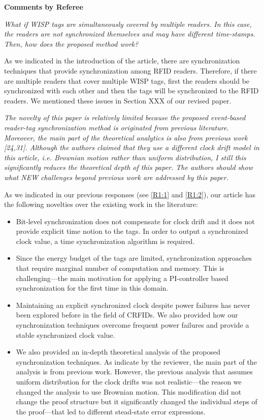 \documentclass[10pt]{article}
\newcommand{\referee}[1]{
	{\item \color{OliveGreen} \emph{{#1}}}
	\label{R\therefereeCounter:\arabic{enumi}}
}
\newcommand{\response}[1]{{\color{blue} #1}}
\newcounter{refereeCounter}
\newenvironment{responses}{%
\refstepcounter{refereeCounter}%
\textbf{\large Comments by Referee \therefereeCounter}
\begin{enumerate}%
\renewcommand{\labelenumi}{\textbf{[R\therefereeCounter :\,\arabic{enumi}]}} %
}{\end{enumerate}}
\begin{document}
\begin{responses}
\referee{What if WISP tags are simultaneously covered by multiple readers. In this case, the readers are not synchronized themselves and may have different time-stamps. Then, how does the proposed method work?}

\response{
As we indicated in the introduction of the article, there are synchronization techniques that provide synchronization among RFID readers. Therefore, if there are multiple readers that cover multiple WISP tags, first the readers should be synchronized with each other and then the tags will be synchronized to the RFID readers. We mentioned these issues in {\color{red} Section XXX} of our revised paper.
}

\referee{The novelty of this paper is relatively limited because the proposed event-based reader-tag synchronization method is originated from previous literature. Moreover, the main part of the theoretical analytics is also from previous work [24,31]. Although the authors claimed that they use a different clock drift model in this article, i.e. Brownian motion rather than uniform distribution, I still this significantly reduces the theoretical depth of this paper. The authors should show what NEW challenges beyond previous work are addressed by this paper. }

\response{
As we indicated in our previous responses (see \hyperref[R1:1]{[R1:1]} and \hyperref[R1:2]{[R1:2]}), our article has the following novelties over the existing work in the literature:
\begin{itemize}
	\item Bit-level synchronization does not compensate for clock drift and it does not provide explicit time notion to the tags. In order to output a synchronized clock value, a time synchronization algorithm is required.
	\item Since the energy budget of the tags are limited, synchronization approaches that require marginal number of computation and memory. This is challenging---the main motivation for applying a PI-controller based  synchronization for the first time in this domain.
	\item Maintaining an explicit synchronized clock despite power failures has never been explored before in the field of CRFIDs. We also provided how our synchronization techniques overcome frequent power failures and provide a stable synchronized clock value.
	\item  We also provided an in-depth theoretical analysis of the proposed synchronization techniques. As indicate by the reviewer, the main part of the analysis is from previous work. However, the previous analysis that assumes uniform distribution for the clock drifts was not realistic---the reason we changed the analysis to use Brownian motion. This modification did not change the proof structure but it significantly changed the individual steps of the proof---that led to different stead-state error expressions.
\end{itemize}
}

\end{responses}
\end{document}
